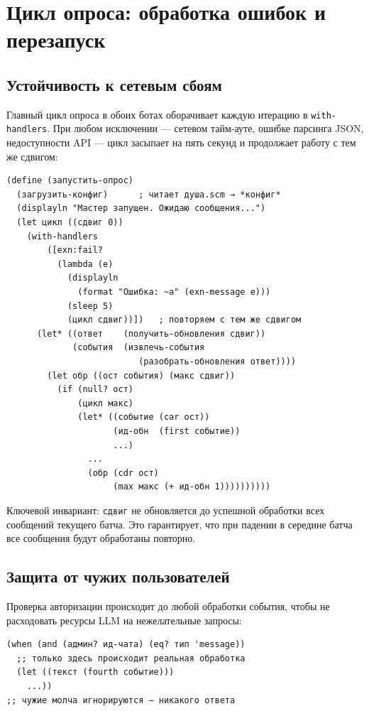 \documentclass[11pt,a4paper]{article}
\begin{document}
\section{Цикл опроса: обработка ошибок и перезапуск}

\subsection{Устойчивость к сетевым сбоям}

Главный цикл опроса в обоих ботах оборачивает каждую итерацию в
\texttt{with-handlers}. При любом исключении — сетевом тайм-ауте,
ошибке парсинга JSON, недоступности API — цикл засыпает на пять секунд
и продолжает работу с тем же сдвигом:

\begin{lstlisting}[language=Racket, caption={Устойчивый цикл опроса с перезапуском}]
(define (запустить-опрос)
  (загрузить-конфиг)      ; читает душа.scm → *конфиг*
  (displayln "Мастер запущен. Ожидаю сообщения...")
  (let цикл ((сдвиг 0))
    (with-handlers
        ([exn:fail?
          (lambda (e)
            (displayln
              (format "Ошибка: ~a" (exn-message e)))
            (sleep 5)
            (цикл сдвиг))])   ; повторяем с тем же сдвигом
      (let* ((ответ    (получить-обновления сдвиг))
             (события  (извлечь-события
                          (разобрать-обновления ответ))))
        (let обр ((ост события) (макс сдвиг))
          (if (null? ост)
              (цикл макс)
              (let* ((событие (car ост))
                     (ид-обн  (first событие))
                     ...)
                ...
                (обр (cdr ост)
                     (max макс (+ ид-обн 1))))))))))
\end{lstlisting}

Ключевой инвариант: \texttt{сдвиг} не обновляется до успешной обработки
всех сообщений текущего батча. Это гарантирует, что при падении в середине
батча все сообщения будут обработаны повторно.

\subsection{Защита от чужих пользователей}

Проверка авторизации происходит до любой обработки события, чтобы не
расходовать ресурсы LLM на нежелательные запросы:

\begin{lstlisting}[language=Racket, caption={Раннее отклонение неавторизованных}]
(when (and (админ? ид-чата) (eq? тип 'message))
  ;; только здесь происходит реальная обработка
  (let ((текст (fourth событие)))
    ...))
;; чужие молча игнорируются — никакого ответа
\end{lstlisting}
\end{document}
